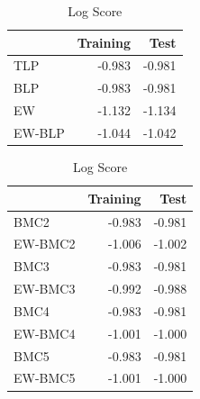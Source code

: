 \documentclass[
]{article}
\begin{document}
\begin{table}[H]
\caption{\label{tab:unnamed-chunk-12}Log Score}

\centering
\fontsize{8}{10}\selectfont
\begin{tabular}[t]{lrr}
\toprule
  & Training & Test\\
\midrule
TLP & -0.983 & -0.981\\
BLP & -0.983 & -0.981\\
EW & -1.132 & -1.134\\
EW-BLP & -1.044 & -1.042\\
\bottomrule
\end{tabular}
\centering
\begin{tabular}[t]{lrr}
\toprule
  & Training & Test\\
\midrule
BMC2 & -0.983 & -0.981\\
EW-BMC2 & -1.006 & -1.002\\
BMC3 & -0.983 & -0.981\\
EW-BMC3 & -0.992 & -0.988\\
BMC4 & -0.983 & -0.981\\
\addlinespace
EW-BMC4 & -1.001 & -1.000\\
BMC5 & -0.983 & -0.981\\
EW-BMC5 & -1.001 & -1.000\\
\bottomrule
\end{tabular}
\end{table}

\clearpage
\end{document}
